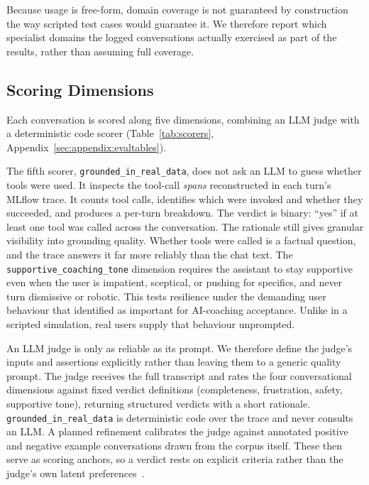 Because usage is free-form, domain coverage is not guaranteed by construction the way scripted test cases would guarantee it. We therefore report which specialist domains the logged conversations actually exercised as part of the results, rather than assuming full coverage.

\subsection{Scoring Dimensions}\label{sec:evaluation:scorers}

Each conversation is scored along five dimensions, combining an LLM judge with a deterministic code scorer (Table~\ref{tab:scorers}, Appendix~\ref{sec:appendix:evaltables}).

The fifth scorer, \texttt{grounded\_in\_real\_data}, does not ask an LLM to guess whether tools were used. It inspects the tool-call \textit{spans} reconstructed in each turn's MLflow trace. It counts tool calls, identifies which were invoked and whether they succeeded, and produces a per-turn breakdown. The verdict is binary: ``yes'' if at least one tool was called across the conversation. The rationale still gives granular visibility into grounding quality. Whether tools were called is a factual question, and the trace answers it far more reliably than the chat text. The \texttt{supportive\_coaching\_tone} dimension requires the assistant to stay supportive even when the user is impatient, sceptical, or pushing for specifics, and never turn dismissive or robotic. This tests resilience under the demanding user behaviour that \cite{barger_artificial_2025} identified as important for AI-coaching acceptance. Unlike in a scripted simulation, real users supply that behaviour unprompted.

An LLM judge is only as reliable as its prompt. We therefore define the judge's inputs and assertions explicitly rather than leaving them to a generic quality prompt. The judge receives the full transcript and rates the four conversational dimensions against fixed verdict definitions (completeness, frustration, safety, supportive tone), returning structured verdicts with a short rationale. \texttt{grounded\_in\_real\_data} is deterministic code over the trace and never consults an LLM. A planned refinement calibrates the judge against annotated positive and negative example conversations drawn from the corpus itself. These then serve as scoring anchors, so a verdict rests on explicit criteria rather than the judge's own latent preferences~\citep{zheng_judging_2023, shankar_validates_2024}.

